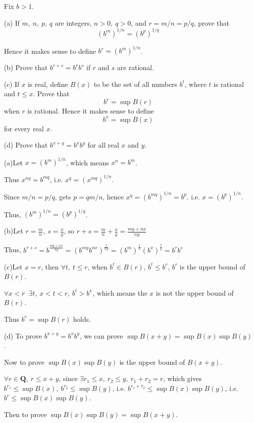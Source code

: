 \begin{question}{}{}
Fix $b>1$. 

(a) If $m,\:n,\:p,\:q$ are integers, $n>0,\:q>0$,
and $r=m/n=p/q$, prove that$$(b^m)^{1/n}=(b^p)^{1/q}$$

Hence it makes sense to define $b^r=(b^m)^{1/n}$.

(b) Prove that $b^{r+s}=b^rb^s$ if $r$ and $s$ are rational. 

(c) If $x$ is real,
define $B(x)$ to be the set of all numbers $b^t$,
where $t$ is rational and $t\le x$.
Prove that $$b^r=\sup B(r)$$
when $r$ is rational.
Hence it makes sense to define $$b^x=\sup B(x)$$
for every real $x$.

(d) Prove that $b^{x+y}=b^xb^y$ for all real $x$ and $y$.
\end{question}
\begin{Proof}
(a)\quad Let $x=(b^m)^{1/n}$,
which means $x^n=b^m$.

Thus $x^{nq}=b^{mq}$, i.e. $x^q=(x^{mq})^{1/n}$.

Since $m/n=p/q$, gets $p=qm/n$,
hence $x^q=(b^{mq})^{1/n}=b^p$.
i.e. $x=(b^p)^{1/n}$.

Thus, $(b^m)^{1/n}=(b^p)^{1/q}$.
\newline

(b)\quad Let $r=\frac{m}{n},\:s=\frac{x}{y}$,
so $r+s=\frac{m}{n}+\frac{x}{y}=\frac{my+nx}{ny}$

Thus,
$b^{r+s}=b^\frac{my+nx}{ny}=(b^{my}b^{nx})^{\frac{1}{ny}}=(b^m)^{\frac{1}{n}}(b^x)^{\frac{1}{y}}=b^rb^s$
\newline

(c)\quad Let $x=r$,
then $\forall t,\:t\le r$, when $b^t\in B(r)$, $b^t\le b^r$,
$b^r$ is the upper bound of $B(r)$.

$\forall x<r\;\;\exists t,\:x<t<r,\:b^t>b^x$,
which means the $x$ is not the upper bound of $B(r)$.

Thus $b^r=\sup B(r)$ holds.
\newline

(d)\quad
To prove $b^{x+y}=b^xb^y$,
we can prove $\sup B(x+y)=\sup B(x)\sup B(y)$.

Now to prove $\sup B(x)\sup B(y)$ is the upper bound of $B(x+y)$.

$\forall r\in\mathbf{Q},\:r\le x+y$,
since $\exists r_1\le x,\:r_2\le y,\:r_1+r_2=r$,
which gives
$b^{r_1}\le\sup B(x),\:b^{r_2}\le\sup B(y)$,
i.e. $b^{r_1+r_2}\le\sup B(x)\sup B(y)$,
i.e. $b^{r}\le\sup B(x)\sup B(y)$.

Then to prove $\sup B(x)\sup B(y)=\sup B(x+y)$.


\end{Proof}
